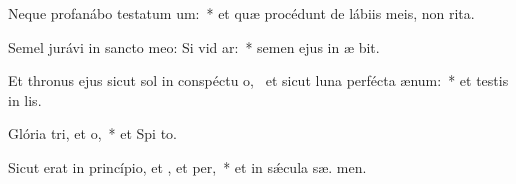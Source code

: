 \item Neque profanábo testatum um:~* et quæ procédunt de lábiis meis, non  rita.
\item Semel jurávi in sancto meo: Si vid ar:~* semen ejus in æ bit.
\item Et thronus ejus sicut sol in conspéctu o,~\pscross{} et sicut luna perfécta  ænum:~* et testis in  lis.
\item Glória tri, et o,~* et Spi to.
\item Sicut erat in princípio, et , et per,~* et in sǽcula sæ. men.
